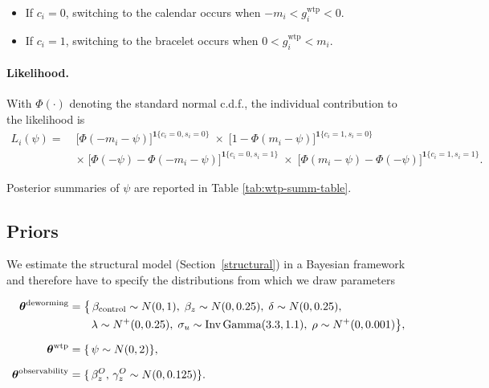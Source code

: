 \documentclass[12pt,a4paper]{article}
\begin{document}
\begin{itemize}
  \item If \(c_i=0\), switching to the calendar occurs when \(-m_i < g_i^{\text{wtp}}<0\).
  \item If \(c_i=1\), switching to the bracelet occurs when \(0< g_i^{\text{wtp}}< m_i\).
\end{itemize}

\paragraph{Likelihood.}
With \(\Phi(\cdot)\) denoting the standard normal c.d.f., the individual contribution to the likelihood is
\[
\begin{aligned}
L_i(\psi)=\;
&\bigl[\Phi(-m_i-\psi)\bigr]^{\mathbf 1\{c_i=0,s_i=0\}}
\;\times\;
\bigl[1-\Phi(m_i-\psi)\bigr]^{\mathbf 1\{c_i=1,s_i=0\}} \\
&\times\;
\bigl[\Phi(-\psi)-\Phi(-m_i-\psi)\bigr]^{\mathbf 1\{c_i=0,s_i=1\}}
\;\times\;
\bigl[\Phi(m_i-\psi)-\Phi(-\psi)\bigr]^{\mathbf 1\{c_i=1,s_i=1\}} .
\end{aligned}
\]

Posterior summaries of \(\psi\) are reported in Table \ref{tab:wtp-summ-table}.
\clearpage

\setcounter{table}{0}
\renewcommand{\thetable}{H\arabic{table}}

\setcounter{figure}{0}
\renewcommand{\thefigure}{H\arabic{figure}}


\subsection{Priors}\label{priors}

We estimate the structural model (Section~\ref{structural}) in a Bayesian framework and therefore have to specify the distributions from which we draw parameters

\[
\begin{aligned}
\boldsymbol{\theta}^{\text{deworming}}
    &= \bigl\{\,
        \beta_{\text{control}} \sim N(0,1),\;
        \beta_{z} \sim N(0,0.25),\;
        \delta \sim N(0,0.25),\\
    &\qquad\lambda \sim N^{+}(0,0.25),\;
        \sigma_{u} \sim \text{Inv\,Gamma}(3.3,1.1),\;
        \rho \sim N^{+}(0,0.001)
      \bigr\},\\[6pt]
\boldsymbol{\theta}^{\text{wtp}}
    &= \{\,
        \psi \sim N(0,2)
      \},\\[6pt]
\boldsymbol{\theta}^{\text{observability}}
    &= \{\,
        \beta^{O}_{z},\,\gamma^{O}_{z} \sim N(0,0.125)
      \}.
\end{aligned}
\]
\end{document}
